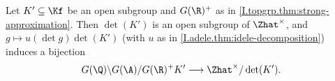 Let $K'\subseteq\Kf$ be an open subgroup and $G(\R)^+$ as in \cref{I.topgrp.thm:strong-approximation}. Then
$\det(K')$ is an open subgroup of $\Zhat^\times$, and $g\mapsto u(\det g)\det(K')$ (with $u$ as in
\cref{I.adele.thm:idele-decomposition}) induces a bijection
\[
  G(\Q)\backslash G(\A)/G(\R)^+K'\longrightarrow\Zhat^\times/\det(K').
\]
